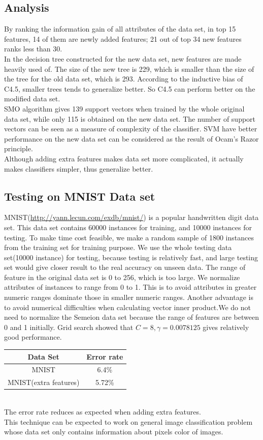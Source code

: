 \documentclass[a4paper,11pt]{article}
\begin{document}
\subsection{Analysis}
By ranking the information gain of all attributes of the data set, in top 15 features, 14 of them are newly added features; 21 out of top 34 new features ranks less than 30. \\
In the decision tree constructed for the new data set, new features are made heavily used of. The size of the new tree is 229, which is smaller than the size of the tree for the old data set, which is 293. According to the inductive bias of C4.5, smaller trees tends to generalize better. So C4.5 can perform better on the modified data set.\\
SMO algorithm gives 139 support vectors when trained by the whole original data set, while only 115 is obtained on the new data set. The number of support vectors can be seen as a measure of complexity of the classifier. SVM have better performance on the new data set can be considered as the result of Ocam's Razor principle.\\
Although adding extra features makes data set more complicated, it actually makes classifiers simpler, thus generalize better.
\subsection{Testing on MNIST Data set}
MNIST(\url{http://yann.lecun.com/exdb/mnist/}) is a popular handwritten digit data set. This data set contains 60000 instances for training, and 10000 instances for testing. To make time cost feasible, we make a random sample of 1800 instances from the training set for training purpose. We use the whole testing data set(10000 instance) for testing, because testing is relatively fast, and large testing set would give closer result to the real accuracy on unseen data. The range of feature in the original data set is 0 to 256, which is too large. We normalize attributes of instances to range from 0 to 1. This is to avoid attributes in greater numeric ranges dominate those in smaller numeric ranges. Another advantage is to avoid numerical difficulties when calculating vector inner product\cite{svm}.We do not need to normalize the Semeion data set because the range of features are between 0 and 1 initially. Grid search showed that $C=8, \gamma=0.0078125$ gives relatively good performance.\\
\vspace{0.5cm}
\begin{tabular}{c c}
Data Set	& Error rate\\
\hline \hline
MNIST	                  & 6.4\%\\
MNIST(extra features)	  & 5.72\%\\
\end{tabular}
\vspace{0.5cm}\\
The error rate reduces as expected when adding extra features. \\
This technique can be expected to work on general image classification problem whose data set only contains information about pixels color of images.
\end{document}
